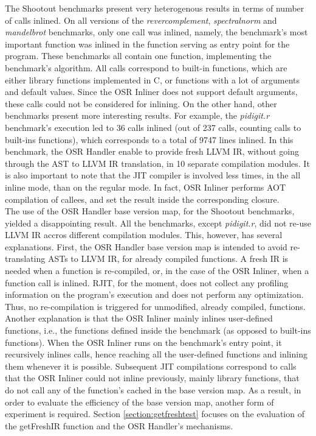 The Shootout benchmarks present very heterogenous results in terms of number of calls inlined.
On all versions of the \textit{revercomplement}, \textit{spectralnorm} and \textit{mandelbrot} benchmarks, only one call was inlined, namely, the benchmark's most important function was inlined in the function serving as entry point for the program.
These benchmarks all contain one function, implementing the benchmark's algorithm.
All calls correspond to built-in functions, which are either library functions implemented in C, or functions with a lot of arguments and default values.
Since the OSR Inliner does not support default arguments, these calls could not be considered for inlining.
On the other hand, other benchmarks present more interesting results. 
For example, the \textit{pidigit.r} benchmark's execution led to 36 calls inlined (out of 237 calls, counting calls to built-ins functions), which corresponds to a total of 9747 lines inlined.
In this benchmark, the OSR Handler enable to provide fresh LLVM IR, without going through the AST to LLVM IR translation, in 10 separate compilation modules.
It is also important to note that the JIT compiler is involved less times, in the all inline mode, than on the regular mode.
In fact, OSR Inliner performs AOT compilation of callees, and set the result inside the corresponding closure.\\

The use of the OSR Handler base version map, for the Shootout benchmarks, yielded a disappointing result.
All the benchmarks, except \textit{pidigit.r}, did not re-use LLVM IR accros different compilation modules.
This, however, has several explanations.
First, the OSR Handler base version map is intended to avoid re-translating ASTs to LLVM IR, for already compiled functions.
A fresh IR is needed when a function is re-compiled, or, in the case of the OSR Inliner, when a function call is inlined.
RJIT, for the moment, does not collect any profiling information on the program's execution and does not perform any optimization. 
Thus, no re-compilation is triggered for unmodified, already compiled, functions.
Another explanation is that the OSR Inliner mainly inlines user-defined functions, i.e., the functions defined inside the benchmark (as opposed to built-ins functions).
When the OSR Inliner runs on the benchmark's entry point, it recursively inlines calls, hence reaching all the user-defined functions and inlining them whenever it is possible.
Subsequent JIT compilations correspond to calls that the OSR Inliner could not inline previously, mainly library functions, that do not call any of the function's cached in the base version map.
As a result, in order to evaluate the efficiency of the base version map, another form of experiment is required.
Section \ref{section:getfreshtest} focuses on the evaluation of the getFreshIR function and the OSR Handler's mechanisms.\\

